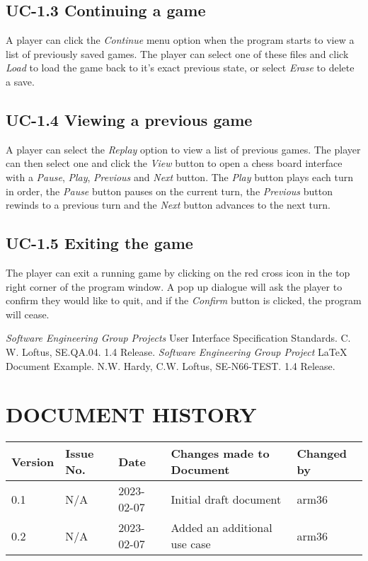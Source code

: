 \documentclass{project}
\begin{document}
\subsection{UC-1.3 Continuing a game}
A player can click the \emph{Continue} menu option when the program starts to view a list of previously saved games. The player can select one of these files and click \emph{Load} to load the game back to it's exact previous state, or select \emph{Erase} to delete a save.
\subsection{UC-1.4 Viewing a previous game}
A player can select the \emph{Replay} option to view a list of previous games. The player can then select one and click the \emph{View} button to open a chess board interface with a \emph{Pause}, \emph{Play}, \emph{Previous} and \emph{Next} button. The \emph{Play} button plays each turn in order, the \emph{Pause} button pauses on the current turn, the \emph{Previous} button rewinds to a previous turn and the \emph{Next} button advances to the next turn.
\subsection{UC-1.5 Exiting the game}
The player can exit a running game by clicking on the red cross icon in the top right corner of the program window. A pop up dialogue will ask the player to confirm they would like to quit, and if the \emph{Confirm} button is clicked, the program will cease.
\clearpage
{}
\begin{thebibliography}{5}
 \emph{Software Engineering Group Projects}
User Interface Specification Standards.
C. W. Loftus, SE.QA.04. 1.4 Release.
 \emph{Software Engineering Group Project}
LaTeX Document Example.
N.W. Hardy, C.W. Loftus, SE-N66-TEST. 1.4 Release.
\end{thebibliography}
\section*{DOCUMENT HISTORY}
\begin{tabular}{|l | l | l | l | l |}
\hline
Version & Issue No. & Date & Changes made to Document & Changed by \\
\hline
0.1 & N/A & 2023-02-07 & Initial draft document & arm36 \\
\hline
0.2 & N/A & 2023-02-07 & Added an additional use case & arm36 \\
\hline
\end{tabular}
\label{thelastpage}
\end{document}
